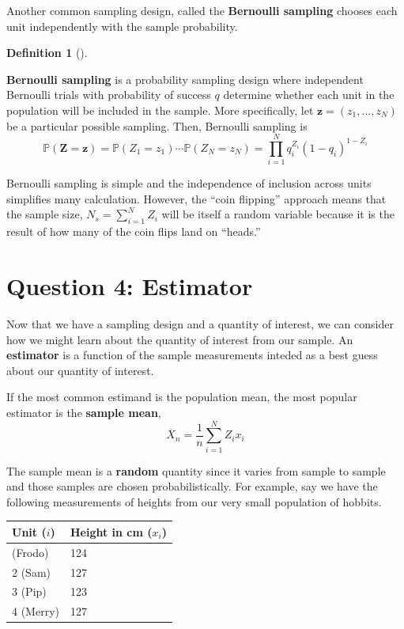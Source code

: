 \documentclass[
  letterpaper,
  DIV=11,
  numbers=noendperiod]{scrreprt}
\newcommand{\mb}{\symbf}
\renewcommand{\P}{\mathbb{P}}
\theoremstyle{definition}
\theoremstyle{definition}
\newtheorem{definition}{Definition}[chapter]
\theoremstyle{plain}
\theoremstyle{remark}
\begin{document}
Another common sampling design, called the \textbf{Bernoulli sampling}
chooses each unit independently with the sample probability.

\begin{definition}[]\protect\hypertarget{def-srs}{}\label{def-srs}

\textbf{Bernoulli sampling} is a probability sampling design where
independent Bernoulli trials with probability of success \(q\) determine
whether each unit in the population will be included in the sample. More
specifically, let \(\mb{z} = (z_{1}, \ldots, z_{N})\) be a particular
possible sampling. Then, Bernoulli sampling is \[
\P(\mb{Z} = \mb{z}) = \P(Z_1 = z_1) \cdots \P(Z_N = z_N) = \prod_{i=1}^N q_i^{Z_i}(1 - q_i)^{1-Z_i}
\]

\end{definition}

Bernoulli sampling is simple and the independence of inclusion across
units simplifies many calculation. However, the ``coin flipping''
approach means that the sample size, \(N_s = \sum_{i=1}^N Z_i\) will be
itself a random variable because it is the result of how many of the
coin flips land on ``heads.''

\hypertarget{question-4-estimator}{%
\section{Question 4: Estimator}\label{question-4-estimator}}

Now that we have a sampling design and a quantity of interest, we can
consider how we might learn about the quantity of interest from our
sample. An \textbf{estimator} is a function of the sample measurements
inteded as a best guess about our quantity of interest.

If the most common estimand is the population mean, the most popular
estimator is the \textbf{sample mean}, \[
\overline{X}_n = \frac{1}{n} \sum_{i=1}^{N}Z_ix_i
\]

The sample mean is a \textbf{random} quantity since it varies from
sample to sample and those samples are chosen probabilistically. For
example, say we have the following measurements of heights from our very
small population of hobbits.

\begin{longtable}[]{@{}ll@{}}
\toprule\noalign{}
Unit (\(i\)) & Height in cm (\(x_i\)) \\
\midrule\noalign{}
\endhead
\bottomrule\noalign{}
\endlastfoot
1 (Frodo) & 124 \\
2 (Sam) & 127 \\
3 (Pip) & 123 \\
4 (Merry) & 127 \\
\end{longtable}
\end{document}
